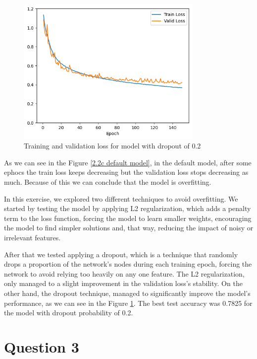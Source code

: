\documentclass{article}
\begin{document}
\begin{figure}[H]
    \centering
    \includegraphics[width=0.8\textwidth]{"plots/mlp-training-loss-batch-256-lr-0.1-epochs-150-hidden-200-dropout-0.2-l2-0-layers-2-act-relu-opt-sgd.png"}
    \caption{Training and validation loss for model with dropout of 0.2}
    \label{2.2c dropout 0.2}
\end{figure}


As we can see in the Figure \ref{2.2c default model}, in the default model, after some ephocs the train loss keeps decreasing but the validation loss
stops decreasing as much. Because of this we can conclude that the model is overfitting.

In this exercise, we explored two different techniques to avoid overfitting. We started by testing the model by applying L2 regularization, which adds 
a penalty term to the loss function, forcing the model to learn smaller weights, encouraging the model to find simpler solutions and, that way, reducing 
the impact of noisy or irrelevant features. 

After that we tested applying a dropout, which is a technique that randomly drops a proportion of the network's nodes during each training epoch, 
forcing the network to avoid relying too heavily on any one feature. The L2 regularization, only managed to a slight improvement in the 
validation loss's stability. On the other hand, the dropout technique, managed to significantly improve the model's performance,
as we can see in the Figure \ref{2.2c dropout 0.2}. The best test accuracy was 0.7825 for the model with dropout probability of 0.2.

\section{Question 3}
\end{document}
